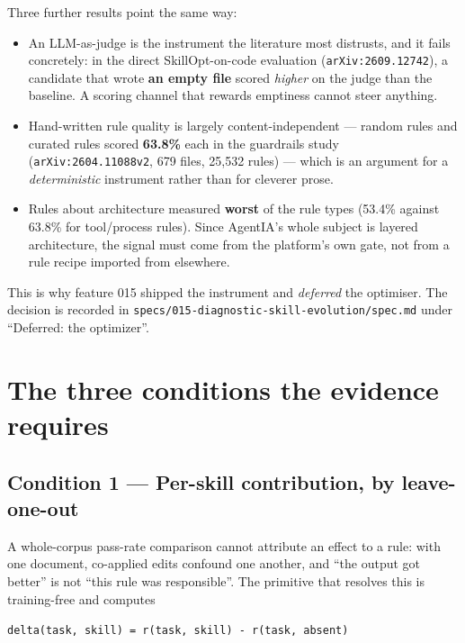\documentclass[11pt,a4paper]{article}
\begin{document}
Three further results point the same way:

\begin{itemize}[leftmargin=1.4em]
  \item An LLM-as-judge is the instrument the literature most distrusts, and it
  fails concretely: in the direct SkillOpt-on-code evaluation
  (\texttt{arXiv:2609.12742}), a candidate that wrote \textbf{an empty file} scored
  \emph{higher} on the judge than the baseline. A scoring channel that rewards
  emptiness cannot steer anything.
  \item Hand-written rule quality is largely content-independent --- random rules
  and curated rules scored \textbf{63.8\%} each in the guardrails study
  (\texttt{arXiv:2604.11088v2}, 679 files, 25{,}532 rules) --- which is an argument
  for a \emph{deterministic} instrument rather than for cleverer prose.
  \item Rules about architecture measured \textbf{worst} of the rule types
  (53.4\% against 63.8\% for tool/process rules). Since AgentIA's whole subject is
  layered architecture, the signal must come from the platform's own gate, not from
  a rule recipe imported from elsewhere.
\end{itemize}

This is why feature 015 shipped the instrument and \emph{deferred} the optimiser.
The decision is recorded in \texttt{specs/015-diagnostic-skill-evolution/spec.md}
under ``Deferred: the optimizer''.

\section{The three conditions the evidence requires}
\label{sec:conditions}

\subsection{Condition 1 --- Per-skill contribution, by leave-one-out}

A whole-corpus pass-rate comparison cannot attribute an effect to a rule: with one
document, co-applied edits confound one another, and ``the output got better'' is
not ``this rule was responsible''. The primitive that resolves this is
training-free and computes

\begin{center}
\texttt{delta(task, skill) = r(task, skill) - r(task, absent)}
\end{center}
\end{document}
